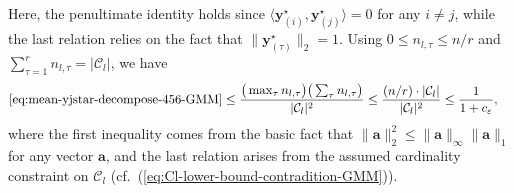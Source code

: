 %
Here, the penultimate identity holds since $\langle\bm{y}_{(i)}^{\star},\bm{y}_{(j)}^{\star}\rangle=0$ for any $i\neq j$,
while the last relation relies on the fact that $\big\|\bm{y}_{(\tau)}^{\star}\big\|_{2}=1$.
Using $0\leq n_{l,\tau} \leq n/r$ and $\sum_{\tau=1}^{r}n_{l,\tau} = |\mathcal{C}_l| $, we have
%
\begin{align*}
	\eqref{eq:mean-yjstar-decompose-456-GMM}  & \leq   \frac{ \big( \max_{\tau} n_{l,\tau} \big) \big( \sum_{\tau} n_{l,\tau} \big) }{|\mathcal{C}_{l}|^2}
	\leq \frac{(n/r) \cdot |\mathcal{C}_l|}{|\mathcal{C}_{l}|^2}
\leq\frac{1}{1+c_{\varepsilon}},
\end{align*}
%
where the first inequality comes from the basic fact that $\|\bm{a}\|_2^2 \leq \|\bm{a}\|_{\infty}\|\bm{a}\|_{1}$ for any vector $\bm{a}$, and the last relation arises from the assumed cardinality constraint on $\mathcal{C}_{l}$ (cf.~(\ref{eq:Cl-lower-bound-contradition-GMM})).

%

